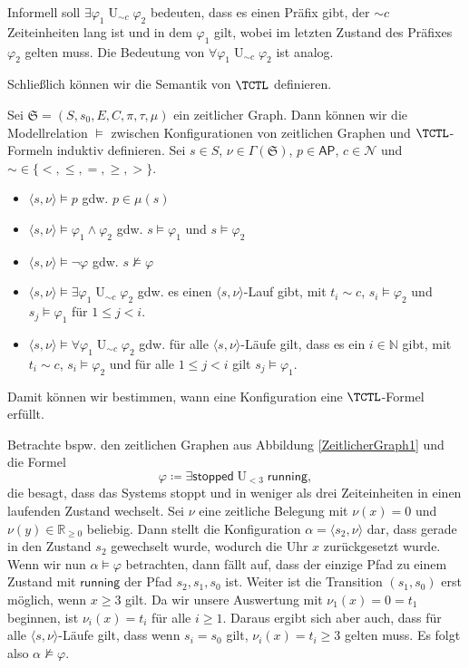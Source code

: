 Informell soll $\exists\varphi_1 \operatorname{U}_{\sim c}\varphi_2$ bedeuten, dass es einen Präfix gibt, der $\sim c$ Zeiteinheiten lang ist und in dem $\varphi_1$ gilt, wobei im letzten Zustand des Präfixes $\varphi_2$ gelten muss.
Die Bedeutung von $\forall\varphi_1 \operatorname{U}_{\sim c}\varphi_2$ ist analog.

Schließlich können wir die Semantik von $\TCTL$ definieren.
\begin{definition}
	Sei $\mathfrak{S}=(S,s_0,E,C,\pi,\tau,\mu)$ ein zeitlicher Graph.
	Dann können wir die Modellrelation $\models$ zwischen Konfigurationen von zeitlichen Graphen und $\TCTL$-Formeln induktiv definieren. Sei $s\in S$, $\nu\in \Gamma(\mathfrak{S})$, $p\in \mathsf{AP}$, $c\in \mathcal{N}$ und $\sim\in \{<,\leq,=,\geq,>\}$. \cite{alur1990model}
	\begin{itemize}
		\item $\langle s,\nu\rangle \models p$ gdw. $p\in \mu(s)$
		\item $\langle s,\nu\rangle \models \varphi_1\land \varphi_2$ gdw. $s\models \varphi_1$ und $s\models \varphi_2$
		\item $\langle s,\nu \rangle \models \neg\varphi$ gdw. $s\not\models\varphi$
		\item $\langle s,\nu \rangle \models \exists\varphi_1 \operatorname{U}_{\sim c}\varphi_2$ gdw. es einen $\langle s,\nu\rangle$-Lauf gibt, mit $t_i \sim c$, $s_i\models \varphi_2$ und $s_j\models \varphi_1$ für $1\leq j < i$.
		\item $\langle s,\nu \rangle\models \forall\varphi_1 \operatorname{U}_{\sim c}\varphi_2$ gdw. für alle $\langle s,\nu\rangle$-Läufe gilt, dass es ein $i\in \mathbb{N}$ gibt, mit $t_i \sim c$, $s_i\models \varphi_2$ und für alle $1\leq j < i$ gilt $s_j\models \varphi_1$.
	\end{itemize}
\end{definition}

Damit können wir bestimmen, wann eine Konfiguration eine $\TCTL$-Formel erfüllt.
\begin{example}
	Betrachte bspw. den zeitlichen Graphen aus Abbildung \ref{ZeitlicherGraph1} und die Formel 
	$$\varphi\coloneqq \exists\mathsf{stopped}\operatorname{U}_{< 3} \mathsf{running},$$ die besagt, dass das Systems stoppt und in weniger als drei Zeiteinheiten in einen laufenden Zustand wechselt.
	Sei $\nu$ eine zeitliche Belegung mit $\nu(x)=0$ und $\nu(y)\in \mathbb{R}_{\geq 0}$ beliebig.
	Dann stellt die Konfiguration $\alpha = \langle s_2,\nu \rangle$ dar, dass gerade in den Zustand $s_2$ gewechselt wurde, wodurch die Uhr $x$ zurückgesetzt wurde.
	Wenn wir nun $\alpha \models \varphi$ betrachten, dann fällt auf, dass der einzige Pfad zu einem Zustand mit $\mathsf{running}$ der Pfad $s_2, s_1,s_0$ ist. 
	Weiter ist die Transition $(s_1,s_0)$ erst möglich, wenn $x\geq 3$ gilt.
	Da wir unsere Auswertung mit $\nu_1(x)=0=t_1$ beginnen, ist $\nu_i(x)=t_i$ für alle $i\geq 1$.
	Daraus ergibt sich aber auch, dass für alle $\langle s,\nu \rangle$-Läufe gilt, dass wenn $s_i = s_0$ gilt, $\nu_i(x)=t_i \geq 3$ gelten muss.
	Es folgt also $\alpha \not\models \varphi$.
\end{example}

